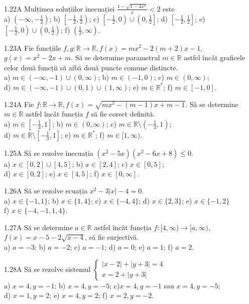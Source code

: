 \documentclass[11pt]{article}
\begin{document}
1.22A Mulțimea soluțiilor inecuației $\frac{1-\sqrt{1-4 x^{2}}}{x}<2$ este\\ a) $\left(-\infty,-\frac{1}{2}\right)$; b) $\left[-\frac{1}{2}, \frac{1}{2}\right)$; c) $\left[-\frac{1}{2}, 0\right) \cup\left(0, \frac{1}{2}\right]$; d) $\left[-\frac{1}{2}, \frac{1}{2}\right]$; e) $\left[-\frac{1}{2}, 0\right) \cup\left(0, \frac{1}{2}\right)$; f) $\left(\frac{1}{2}, \infty\right)$.

1.23A Fie funcțiile $f, g: \mathbb{R} \rightarrow \mathbb{R}, f(x)=m x^{2}-2(m+2) x-1$, $g(x)=x^{2}-2 x+m$. Să se determine parametrul $m \in \mathbb{R}$ astfel încât graficele celor două funcții să aibă două puncte comune distincte.\\ a) $m \in(-\infty,-1) \cup(0, \infty)$; b) $m \in(-1,0)$; c) $m \in(0, \infty)$;\\ d) $m \in(-\infty,-1) \cup(0,1) \cup(1, \infty)$; e) $m \in \mathbb{R}^{*}$; f) $m \in[-1,0]$.

1.24A Fie $f: \mathbb{R} \rightarrow \mathbb{R}, f(x)=\sqrt{m x^{2}-(m-1) x+m-1}$. Să se determine $m \in \mathbb{R}$ astfel încât funcția $f$ să fie corect definită.\\ a) $m \in\left[-\frac{1}{3}, 1\right]$; b) $m \in(0, \infty)$; c) $m \in \mathbb{R} \setminus\left(-\frac{1}{3}, 1\right)$;\\ d) $m \in \mathbb{R} \setminus\left[-\frac{1}{3}, 1\right]$; e) $m \in \mathbb{R}^{*}$; f) $m \in[1, \infty)$.

1.25A Să se rezolve inecuația $\left(x^{2}-5 x\right)\left(x^{2}-6 x+8\right) \leq 0$.\\ a) $x \in[0,2] \cup[4,5]$; b) $x \in[2,4]$; c) $x \in[0,5]$;\\ d) $x \in[0,2]$; e) $x \in[4,5]$; f) $x \in[0, \infty]$.

1.26A Să se rezolve ecuația $x^{2}-3|x|-4=0$.\\ a) $x \in\{-1,1\}$; b) $x \in\{1,4\}$; c) $x \in\{-4,4\}$; d) $x \in\{2,3\}$; e) $x \in\{-1,2\}$\\ f) $x \in\{-4,-1,1,4\}$.

1.27A Să se determine $a \in \mathbb{R}$ astfel încât funcția $f:[4, \infty) \rightarrow[a, \infty)$, $f(x)=x-5-2 \sqrt{x-4}$, să fie surjectivă.\\ a) $a=-3$; b) $a=-2$; c) $a=-1$; d) $a=0$; e) $a=1$; f) $a=2$.

1.28A Să se rezolve sistemul $\left\{\begin{array}{l}|x-2|+|y+3|=4 \\ x=2+|y+3|\end{array}\right.$\\ a) $x=4, y=-1$; b) $x=4, y=-5$; c)$x=4, y=-1$ sau $x=4, y=-5$;\\ d) $x=1, y=2$; e) $x=4, y=2$; f) $x=2, y=-2$.
\end{document}

